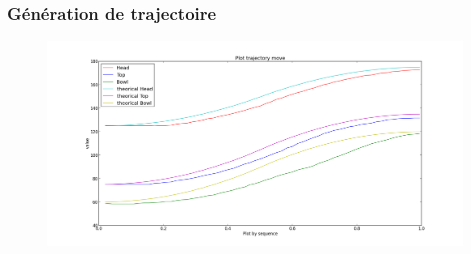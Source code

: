 \begin{frame}
  \frametitle{Génération de trajectoire}
            \begin{figure}
                \begin{center}
                    \includegraphics[width=11cm]{../img/TrajectoryPlot.png}
                \end{center}
            \end{figure}
\end{frame}
